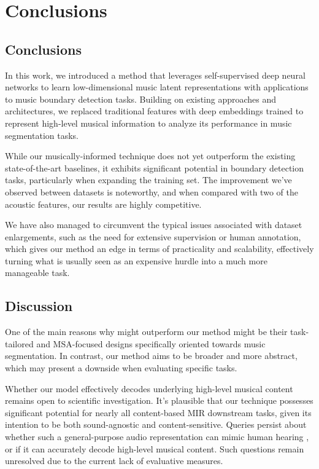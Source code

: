 \chapter{Conclusions}

\section{Conclusions}

In this work, we introduced a method that leverages self-supervised deep neural networks to learn low-dimensional music latent representations with applications to music boundary detection tasks. Building on existing approaches and architectures, we replaced traditional features with deep embeddings trained to represent high-level musical information to analyze its performance in music segmentation tasks.

While our musically-informed technique does not yet outperform the existing state-of-the-art baselines, it exhibits significant potential in boundary detection tasks, particularly when expanding the training set. The improvement we've observed between datasets is noteworthy, and when compared with two of the acoustic features, our results are highly competitive. 

We have also managed to circumvent the typical issues associated with dataset enlargements, such as the need for extensive supervision or human annotation, which gives our method an edge in terms of practicality and scalability, effectively turning what is usually seen as an expensive hurdle into a much more manageable task.

\section{Discussion}

One of the main reasons why \cite{deepfeaturesegment, SalamonDeepSegmentation} might outperform our method might be their task-tailored and MSA-focused designs specifically oriented towards music segmentation. In contrast, our method aims to be broader and more abstract, which may present a downside when evaluating specific tasks.

Whether our model effectively decodes underlying high-level musical content remains open to scientific investigation. It's plausible that our technique possesses significant potential for nearly all content-based MIR downstream tasks, given its intention to be both sound-agnostic and content-sensitive. Queries persist about whether such a general-purpose audio representation can mimic human hearing \cite{Li2023MERT:Training, Turian2022HEAR:Representations}, or if it can accurately decode high-level musical content. Such questions remain unresolved due to the current lack of evaluative measures. 

